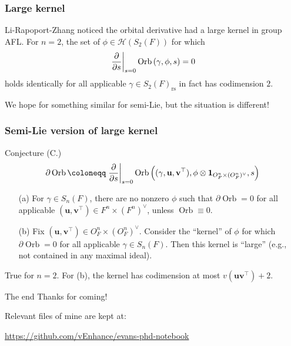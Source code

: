 \documentclass[11pt]{beamer}
\DeclareMathOperator{\Orb}{Orb}
\newcommand{\HH}{\mathcal{H}}
\renewcommand{\OO}{O}
\newcommand{\guv}{{(\gamma, \uu, \vv^\top)}}
\newcommand{\oneV}{\mathbf{1}_{\OO_F^n \times (\OO_F^n)^\vee}}
\newcommand{\rs}{_{\text{rs}}}
\newcommand{\uu}{\mathbf{u}}
\newcommand{\vv}{\mathbf{v}}
\begin{document}
\begin{frame}
  \frametitle{Large kernel}
  \begin{itemize}
  \ii Li-Rapoport-Zhang noticed the orbital derivative had a large kernel in group AFL.
  \ii For $n=2$, the set of $\phi \in \HH(S_2(F))$ for which
    \[ \left. \pdv{}{s} \right\rvert_{s=0} \Orb \left(\gamma, \phi, s \right) = 0 \]
    holds identically for all applicable $\gamma \in S_2(F)\rs$
    in fact has codimension $2$.
  \end{itemize}
  We hope for something similar for semi-Lie, but the situation is different!
\end{frame}
\begin{frame}
  \frametitle{Semi-Lie version of large kernel}
  \begin{block}{Conjecture (C.)}
    \[ \partial \Orb \coloneqq \left. \pdv{}{s} \right\rvert_{s=0}
      \Orb \left(\guv, \phi \otimes \oneV, s \right) \]
    \begin{enumerate}
    \item[(a)] For $\gamma \in S_n(F)$,
    there are no nonzero $\phi$ such that $\partial \Orb = 0$
    for all applicable $(\uu, \vv^\top) \in F^n \times (F^n)^\vee$, unless $\Orb \equiv 0$.

    \item[(b)] Fix $(\uu, \vv^\top) \in \OO_F^n \times (\OO_F^n)^\vee$.
    Consider the ``kernel'' of $\phi$ for which $\partial \Orb = 0$
    for all applicable $\gamma \in S_n(F)$.
    Then this kernel is ``large'' (e.g., not contained in any maximal ideal).
    \end{enumerate}
  \end{block}
  \begin{theorem}
    [C.]
    True for $n=2$.
    For (b), the kernel has codimension at most $v(\uu\vv^\top)+2$.
  \end{theorem}
\end{frame}

\begin{frame}
  \begin{block}{The end}
    Thanks for coming!
  \end{block}

  Relevant files of mine are kept at:
  \begin{itemize}
    \ii \url{https://github.com/vEnhance/evans-phd-notebook}
  \end{itemize}
\end{frame}
\end{document}
